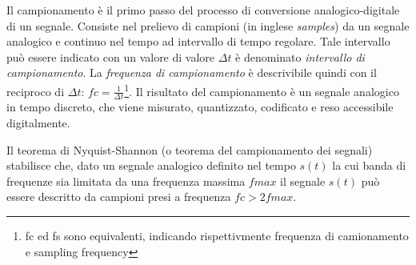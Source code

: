 Il campionamento è il primo passo del processo di conversione analogico-digitale
di un segnale. Consiste nel prelievo di campioni (in inglese \emph{samples}) da
un segnale analogico e continuo nel tempo ad intervallo di tempo regolare.
Tale intervallo può essere indicato con un valore di valore $\Delta t$ è denominato
\emph{intervallo di campionamento}. La \emph{frequenza di campionamento} è descrivibile quindi
con il reciproco di $\Delta t$: $fc = \frac{1}{\Delta t}$\footnote{fc ed fs sono equivalenti, indicando rispettivmente frequenza di camionamento e sampling frequency}.
Il risultato del campionamento è un segnale analogico in tempo discreto, che viene
misurato, quantizzato, codificato e reso accessibile digitalmente.

Il teorema di Nyquist-Shannon (o teorema del campionamento dei segnali) stabilisce che,
dato un segnale analogico definito nel tempo $s(t)$ la cui banda di frequenze sia limitata da una frequenza massima $fmax$
il segnale $s(t)$ può essere descritto da campioni presi a frequenza $fc > 2fmax$.
